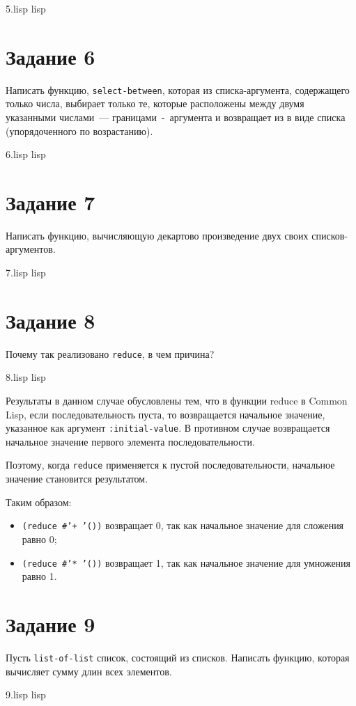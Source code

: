 {5.lisp}
{lisp}
{}

\section{Задание 6}
Написать функцию, \texttt{select-between}, которая из списка-аргумента, содержащего только числа, выбирает только те, которые расположены между двумя указанными числами~--- границами~-~аргумента и возвращает из в виде списка (упорядоченного по возрастанию).

{6.lisp}
{lisp}
{}

\section{Задание 7}
Написать функцию, вычисляющую декартово произведение двух своих списков-аргументов.

{7.lisp}
{lisp}
{}

\section{Задание 8}
Почему так реализовано \texttt{reduce}, в чем причина?

{8.lisp}
{lisp}
{}

Результаты в данном случае обусловлены тем, что в функции reduce в Common Lisp, если последовательность пуста, то возвращается начальное значение, указанное как аргумент \texttt{:initial-value}. 
В противном случае возвращается начальное значение первого элемента последовательности.

Поэтому, когда \texttt{reduce} применяется к пустой последовательности, начальное значение становится результатом. 

Таким образом:
\begin{itemize}
	\item \texttt{(reduce \#'+ '())} возвращает 0, так как начальное значение для сложения равно 0;
	\item \texttt{(reduce \#'* '())} возвращает 1, так как начальное значение для умножения равно 1.
\end{itemize}

\section{Задание 9}
Пусть \texttt{list-of-list} список, состоящий из списков. Написать функцию, которая вычисляет сумму длин всех элементов.

{9.lisp}
{lisp}
{}
